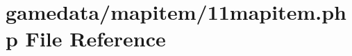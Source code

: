 \hypertarget{11mapitem_8php}{\section{gamedata/mapitem/11mapitem.php File Reference}
\label{11mapitem_8php}
}
